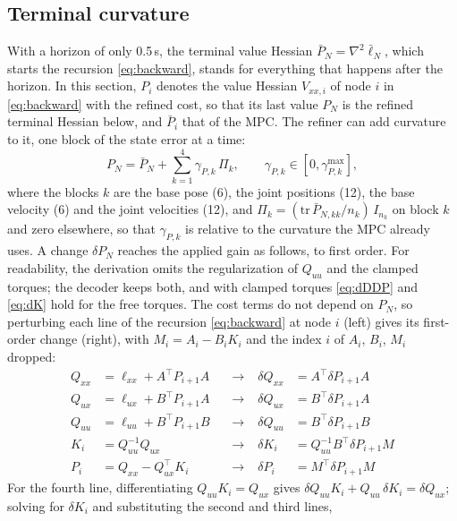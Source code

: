 \documentclass[conference]{IEEEtran}
\newcommand{\T}{^{\top}}
\begin{document}
\subsection{Terminal curvature}
\label{sec:terminal}
With a horizon of only 0.5\,s, the terminal value Hessian $\bar P_N=\nabla^2\bar\ell_N$, which starts the recursion \eqref{eq:backward}, stands for everything that happens after the horizon. In this section, $P_i$ denotes the value Hessian $V_{xx,i}$ of node $i$ in \eqref{eq:backward} with the refined cost, so that its last value $P_N$ is the refined terminal Hessian below, and $\bar P_i$ that of the MPC.
The refiner can add curvature to it, one block of the state error at a time:
\begin{equation}
P_N=\bar P_N+\textstyle\sum_{k=1}^{4}\gamma_{P,k}\,\Pi_k,\qquad \gamma_{P,k}\in[0,\gamma^{\max}_{P,k}],
\label{eq:terminal}
\end{equation}
where the blocks $k$ are the base pose (6), the joint positions (12), the base velocity (6) and the joint velocities (12), and $\Pi_k=(\mathrm{tr}\,\bar P_{N,kk}/n_k)\,I_{n_k}$ on block $k$ and zero elsewhere, so that $\gamma_{P,k}$ is relative to the curvature the MPC already uses.
A change $\delta P_N$ reaches the applied gain as follows, to first order. For readability, the derivation omits the regularization of $Q_{uu}$ and the clamped torques; the decoder keeps both, and with clamped torques \eqref{eq:dDDP} and \eqref{eq:dK} hold for the free torques.
The cost terms do not depend on $P_N$, so perturbing each line of the recursion \eqref{eq:backward} at node $i$ (left) gives its first-order change (right), with $M_i=A_i-B_iK_i$ and the index $i$ of $A_i$, $B_i$, $M_i$ dropped:
\begin{equation}
\begin{alignedat}{3}
Q_{xx}&=\ell_{xx}+A\T P_{i+1}A &\,&\to& \;\delta Q_{xx}&=A\T\delta P_{i+1}A\\
Q_{ux}&=\ell_{ux}+B\T P_{i+1}A &&\to& \;\delta Q_{ux}&=B\T\delta P_{i+1}A\\
Q_{uu}&=\ell_{uu}+B\T P_{i+1}B &&\to& \;\delta Q_{uu}&=B\T\delta P_{i+1}B\\
K_i&=Q_{uu}^{-1}Q_{ux} &&\to& \;\delta K_i&=Q_{uu}^{-1}B\T\delta P_{i+1}M\\
P_i&=Q_{xx}-Q_{ux}\T K_i &&\to& \;\delta P_i&=M\T\delta P_{i+1}M
\end{alignedat}
\label{eq:dDDP}
\end{equation}
For the fourth line, differentiating $Q_{uu}K_i=Q_{ux}$ gives $\delta Q_{uu}K_i+Q_{uu}\,\delta K_i=\delta Q_{ux}$; solving for $\delta K_i$ and substituting the second and third lines,
\end{document}
